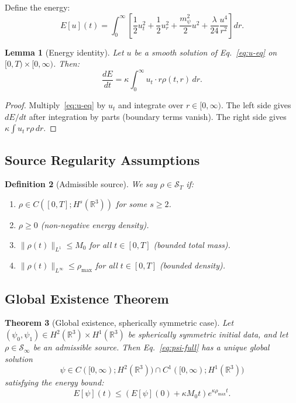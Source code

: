 \documentclass[11pt,a4paper]{article}
\newtheorem{theorem}{Theorem}[section]
\newtheorem{lemma}[theorem]{Lemma}
\newtheorem{definition}[theorem]{Definition}
\theoremstyle{remark}
\begin{document}
Define the energy:
\begin{equation}
E[u](t) = \int_0^\infty \left[\frac{1}{2}u_t^2 + \frac{1}{2}u_r^2
+ \frac{m_\psi^2}{2}u^2 + \frac{\lambda}{24}\frac{u^4}{r^2}\right] dr.
\label{eq:energy}
\end{equation}

\begin{lemma}[Energy identity]
\label{lem:energy-id}
Let $u$ be a smooth solution of Eq.~\eqref{eq:u-eq} on $[0, T) \times [0, \infty)$.
Then:
\begin{equation}
\frac{dE}{dt} = \kappa\int_0^\infty u_t \cdot r\rho(t,r)\,dr.
\end{equation}
\end{lemma}

\begin{proof}
Multiply~\eqref{eq:u-eq} by $u_t$ and integrate over $r \in [0, \infty)$.
The left side gives $dE/dt$ after integration by parts (boundary terms vanish).
The right side gives $\kappa\int u_t\,r\rho\,dr$.
\end{proof}

\subsection{Source Regularity Assumptions}

\begin{definition}[Admissible source]
We say $\rho \in \mathcal{S}_T$ if:
\begin{enumerate}
\item $\rho \in C([0,T]; H^s(\mathbb{R}^3))$ for some $s \geq 2$.
\item $\rho \geq 0$ (non-negative energy density).
\item $\|\rho(t)\|_{L^1} \leq M_0$ for all $t \in [0, T]$ (bounded total mass).
\item $\|\rho(t)\|_{L^\infty} \leq \rho_{\max}$ for all $t \in [0, T]$ (bounded density).
\end{enumerate}
\end{definition}

\subsection{Global Existence Theorem}

\begin{theorem}[Global existence, spherically symmetric case]
\label{thm:global-spherical}
Let $(\psi_0, \psi_1) \in H^2(\mathbb{R}^3) \times H^1(\mathbb{R}^3)$ be
spherically symmetric initial data, and let $\rho \in \mathcal{S}_\infty$
be an admissible source. Then Eq.~\eqref{eq:psi-full} has a unique global
solution
\begin{equation}
\psi \in C([0, \infty); H^2(\mathbb{R}^3)) \cap C^1([0, \infty); H^1(\mathbb{R}^3))
\end{equation}
satisfying the energy bound:
\begin{equation}
E[\psi](t) \leq \left(E[\psi](0) + \kappa M_0 t\right) e^{\kappa\rho_{\max} t}.
\end{equation}
\end{theorem}
\end{document}
